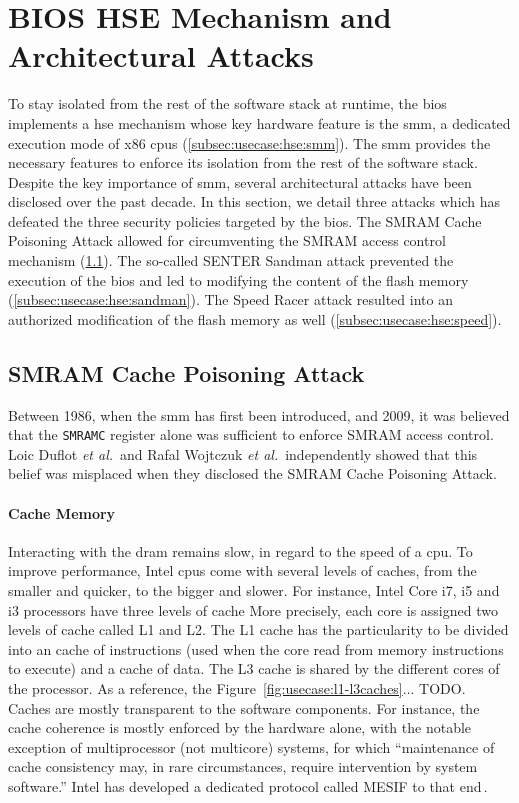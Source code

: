 \section{BIOS HSE Mechanism and Architectural Attacks}
\label{sec:usecase:hse}

To stay isolated from the rest of the software stack at runtime, the \ac{bios}
implements a \ac{hse} mechanism whose key hardware feature is the \ac{smm}, a
dedicated execution mode of x86 \acp{cpu} (\ref{subsec:usecase:hse:smm}).
%
The \ac{smm} provides the necessary features to enforce its isolation from the
rest of the software stack.
%
Despite the key importance of \ac{smm}, several architectural attacks have been
disclosed over the past decade.
%
In this section, we detail three attacks which has defeated the three security
policies targeted by the \ac{bios}.
%
The SMRAM Cache Poisoning Attack allowed for
circumventing the SMRAM access control mechanism
(\ref{subsec:usecase:hse:smram}).
%
The so-called SENTER Sandman attack prevented
the execution of the \ac{bios} and led to modifying the content of the flash
memory (\ref{subsec:usecase:hse:sandman}).
%
The Speed Racer attack resulted into an authorized modification of the flash
memory as well (\ref{subsec:usecase:hse:speed}).

\subsection{SMRAM Cache Poisoning Attack} %
\label{subsec:usecase:hse:smram}

Between 1986, when the \ac{smm} has first been introduced, and 2009, it was
believed that the \texttt{SMRAMC} register alone was sufficient to enforce SMRAM
access control.
%
Loic Duflot \emph{et al.}\,\cite{duflot2009smram} and Rafal Wojtczuk \emph{et
  al.}\,\cite{wojtczuk2009smram} independently showed that this belief was
misplaced when they disclosed the SMRAM Cache Poisoning Attack.

\paragraph{Cache Memory}
%
Interacting with the \ac{dram} remains slow, in regard to the speed of a
\ac{cpu}.
%
To improve performance, Intel \acp{cpu} come with several levels of caches, from
the smaller and quicker, to the bigger and slower.
%
For instance, Intel Core i7, i5 and i3 processors have three levels of cache
%
More precisely, each core is assigned two levels of cache called L1 and L2.
%
The L1 cache has the particularity to be divided into an cache of instructions
(used when the core read from memory instructions to execute) and a cache of
data.
%
The L3 cache is shared by the different cores of the processor.
%
As a reference, the Figure~\ref{fig:usecase:l1-l3caches}... TODO.
%
Caches are mostly transparent to the software components.
%
For instance, the cache coherence is mostly enforced by the hardware alone, with
the notable exception of multiprocessor (not multicore) systems, for which
``maintenance of cache consistency may, in rare circumstances, require
intervention by system software.''
%
Intel has developed a dedicated protocol called MESIF to that
end\,\cite{thomadakis2011nehalem}.

